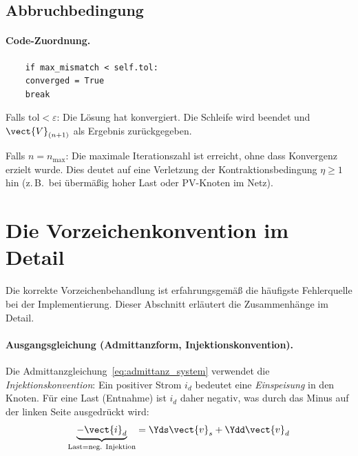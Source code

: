 \subsection{Abbruchbedingung}
\label{subsec:abbruch}

\paragraph{Code-Zuordnung.}
\begin{verbatim}
	if max_mismatch < self.tol:
	converged = True
	break
\end{verbatim}

Falls $\text{tol} < \varepsilon$: Die Lösung hat konvergiert. Die Schleife wird beendet und $\vect{V}_{(n+1)}$ als Ergebnis zurückgegeben.

Falls $n = n_{\max}$: Die maximale Iterationszahl ist erreicht, ohne dass Konvergenz erzielt wurde. Dies deutet auf eine Verletzung der Kontraktionsbedingung $\eta \geq 1$ hin (z.\,B.\ bei übermäßig hoher Last oder PV-Knoten im Netz).

\section{Die Vorzeichenkonvention im Detail}
\label{subsec:vorzeichen}

Die korrekte Vorzeichenbehandlung ist erfahrungsgemäß die häufigste Fehlerquelle bei der Implementierung. Dieser Abschnitt erläutert die Zusammenhänge im Detail.

\paragraph{Ausgangsgleichung (Admittanzform, Injektionskonvention).}
Die Admittanzgleichung~\eqref{eq:admittanz_system} verwendet die \textit{Injektionskonvention}: Ein positiver Strom $i_d$ bedeutet eine \textit{Einspeisung} in den Knoten. Für eine Last (Entnahme) ist $i_d$ daher negativ, was durch das Minus auf der linken Seite ausgedrückt wird:
\begin{equation}
	\underbrace{-\vect{i}_d}_{\text{Last}=\text{neg. Injektion}} = \Yds \vect{v}_s + \Ydd \vect{v}_d
	\label{eq:vorzeichen_1}
\end{equation}

